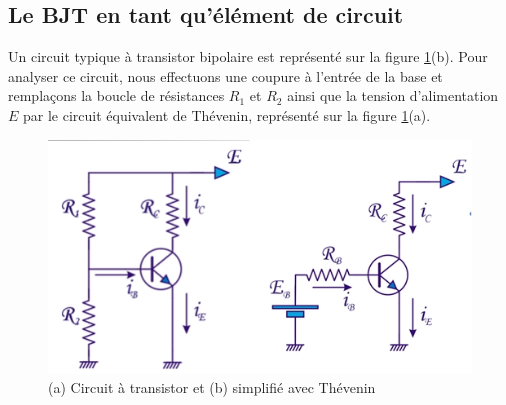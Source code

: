 \subsection{Le BJT en tant qu'élément de circuit}
Un circuit typique à transistor bipolaire est représenté sur la figure \ref{fig:bjt_load1}(b). Pour analyser ce circuit, nous effectuons une coupure à l'entrée de la base et remplaçons la boucle de résistances $R_1$ et $R_2$ ainsi que la tension d'alimentation $E$ par le circuit équivalent de Thévenin, représenté sur la figure \ref{fig:bjt_load1}(a).

\begin{figure}[h!]
	\centering
	\includegraphics[width=12cm]{figures/ch02/bjt_load1.jpg}
	\caption{(a) Circuit à transistor et (b) simplifié avec Thévenin}
	\label{fig:bjt_load1}
\end{figure}

